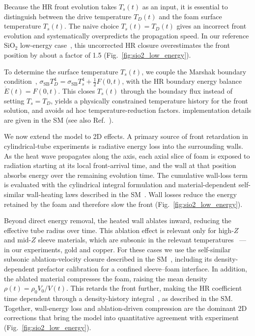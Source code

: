 \documentclass[prl, twocolumn, superscriptaddress, amsmath, amssymb, reprint]{revtex4-2}
\begin{document}
Because the HR front evolution takes $T_s(t)$ as an input, it is essential to distinguish between the drive temperature $T_D(t)$ and the foam surface temperature $T_s(t)$. The naive choice $T_s(t)=T_D(t)$ gives an incorrect front evolution and systematically overpredicts the propagation speed. In our reference $\mathrm{SiO}_2$ low-energy case~\cite{Back2000PRL}, this uncorrected HR closure overestimates the front position by about a factor of 1.5 (Fig.~\ref{fig:sio2_low_energy}).

To determine the surface temperature $T_s(t)$, we couple the Marshak boundary condition~\cite{Pomraning1979,Olson2000}, $\sigma_{\mathrm{SB}}T_D^4=\sigma_{\mathrm{SB}}T_s^4+\tfrac{1}{2}F(0,t)$, with the HR boundary energy balance $\dot{E}(t)=F(0,t)$. This closes $T_s(t)$ through the boundary flux instead of setting $T_s=T_D$, yields a physically constrained temperature history for the front solution, and avoids ad hoc temperature-reduction factors. implementation details are given in the SM (see also Ref.~\cite{Cohen2018}).

We now extend the model to 2D effects. A primary source of front retardation in cylindrical-tube experiments is radiative energy loss into the surrounding walls. As the heat wave propagates along the axis, each axial slice of foam is exposed to radiation starting at its local front-arrival time, and the wall at that position absorbs energy over the remaining evolution time. The cumulative wall-loss term is evaluated with the cylindrical integral formulation and material-dependent self-similar wall-heating laws described in the SM~\cite{Shussman2015,Cohen2020Key,Cohen2018}.
Wall losses reduce the energy retained by the foam and therefore slow the front (Fig.~\ref{fig:sio2_low_energy}).

Beyond direct energy removal, the heated wall ablates inward, reducing the effective tube radius over time. This ablation effect is relevant only for high-$Z$ and mid-$Z$ sleeve materials, which are subsonic in the relevant temperatures~\cite{ZeldovichRaizer2002,PakulaSigel1985,Shussman2015} --- in our experiments, gold and copper. For these cases we use the self-similar subsonic ablation-velocity closure described in the SM~\cite{Cohen2020Key,Shussman2015}, including its density-dependent prefactor calibration for a confined sleeve--foam interface.
In addition, the ablated material compresses the foam, raising the mean density $\rho(t) = \rho_0 V_0 / V(t)$. This retards the front further, making the HR coefficient time dependent through a density-history integral~\cite{Cohen2020Key,Shussman2015}, as described in the SM. Together, wall-energy loss and ablation-driven compression are the dominant 2D corrections that bring the model into quantitative agreement with experiment (Fig.~\ref{fig:sio2_low_energy}).
\end{document}
